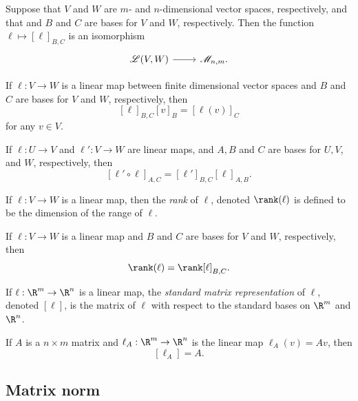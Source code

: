 \begin{lemma} \label{matrix-rep-isomorphism}
	Suppose that $V$ and $W$ are $m$- and $n$-dimensional vector spaces, respectively, and that and $B$ and $C$ are bases for $V$ and $W$, respectively. Then the function $\ell \mapsto [\ell]_{B,C}$ is an isomorphism \[ \begin{tikzcd} \mathscr{L}(V, W) \ar{r} & \mathscr{M}_{n,m}. \end{tikzcd} \] 
\end{lemma}

\begin{lemma}
	If $\ell : V \to W$ is a linear map between finite dimensional vector spaces and $B$ and $C$ are bases for $V$ and $W$, respectively, then \[ [\ell]_{B,C}[v]_B = [\ell(v)]_C \]
	for any $v  \in V$. 
\end{lemma}

\begin{lemma}
	If $\ell : U \to V$ and $\ell' :  V \to W$ are linear maps, and $A, B$ and $C$ are bases for $U, V$, and $W$, respectively, then 
	\[ [\ell' \circ \ell]_{A,C} = [\ell']_{B,C}[\ell]_{A,B}. \]
\end{lemma}

\begin{definition}
	If $\ell : V \to W$ is a linear map, then the \emph{rank} of $\ell$, denoted $\rank(\ell)$ is defined to be the dimension of the range of $\ell$. 
\end{definition}

\begin{lemma}
	If $\ell : V \to W$ is a linear map and $B$ and $C$ are bases for $V$ and $W$, respectively, then \[ \rank (\ell) = \rank [\ell]_{B,C}. \]
\end{lemma}

\begin{definition} \label{matrix-representation-standard}
	If $\ell : \R^m \to \R^n$ is a linear map, the \emph{standard matrix representation} of $\ell$, denoted $[\ell]$, is the matrix of $\ell$ with respect to the standard bases on $\R^m$ and $\R^n$.
\end{definition} 

\begin{lemma}
	If $A$ is a $n \times m$ matrix and $\ell_A : \R^m \to \R^n$ is the linear map $\ell_A(v) = Av$, then \[ [\ell_A] = A. \]
\end{lemma}

\subsection{Matrix norm} \label{matrix-norm}

